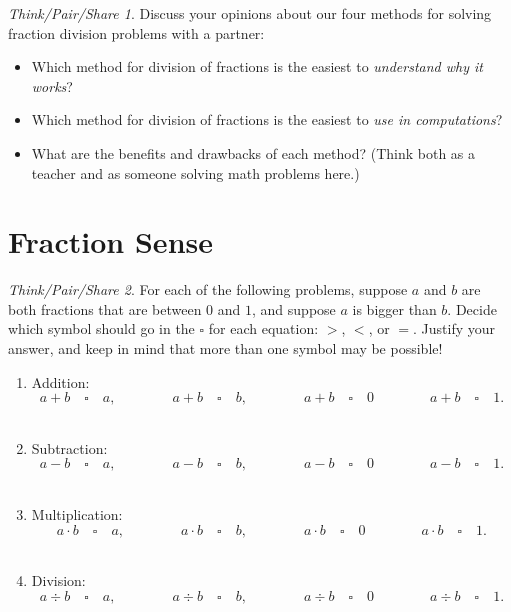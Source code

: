 \documentclass[10pt, reqno]{amsart}
\theoremstyle{remark}
\newtheorem*{thinkpair*}{Think/Pair/Share}
\theoremstyle{definition}
\numberwithin{equation}{section}  %
\begin{document}
\begin{thinkpair*}
Discuss your opinions about our four methods for solving fraction division problems with a partner:

\begin{itemize}
\item
Which method for division of fractions is the easiest to \emph{understand why it works}? 
\item
Which method for division of fractions is the easiest to \emph{use in computations}? 
\item
What are the benefits and drawbacks of each method?  (Think both as a teacher and as someone solving math problems here.) 
\end{itemize}
\end{thinkpair*}




\section{Fraction Sense}

\begin{thinkpair*}
For each of the following problems, suppose $a$ and $b$ are both fractions that are between $0$ and $1$, and suppose $a$ is bigger than $b$.  Decide which symbol should go in the $\square$ for each equation: $>$, $<$,  or $=$.  Justify your answer, and keep in mind that more than one symbol may be possible!

\begin{enumerate}
\item
Addition:
\[
a + b \quad  \square \quad a,
\qquad\qquad
a + b \quad  \square \quad b,
\qquad\qquad
a + b \quad  \square \quad 0
\qquad\qquad
a + b \quad  \square \quad 1.
\]\\

\item
Subtraction:
\[
a - b \quad  \square \quad a,
\qquad\qquad
a - b \quad  \square \quad b,
\qquad\qquad
a - b \quad  \square \quad 0
\qquad\qquad
a - b \quad  \square \quad 1.
\]\\


\item
Multiplication:
\[
a\cdot b \quad  \square \quad a,
\qquad\qquad
a \cdot b \quad  \square \quad b,
\qquad\qquad
a \cdot b \quad  \square \quad 0
\qquad\qquad
a \cdot b \quad  \square \quad 1.
\]\\



\item
Division:
\[
a\div b \quad  \square \quad a,
\qquad\qquad
a \div b \quad  \square \quad b,
\qquad\qquad
a \div b \quad  \square \quad 0
\qquad\qquad
a \div b \quad  \square \quad 1.
\]\\


\end{enumerate}
\end{thinkpair*}
\end{document}
